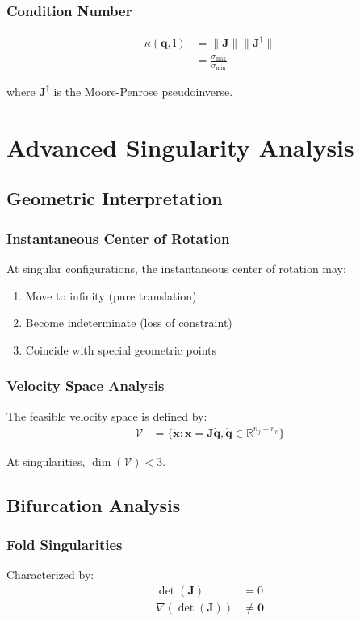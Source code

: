 \documentclass[11pt,a4paper]{article}
\begin{document}
\subsubsection{Condition Number}
\begin{align}
\kappa(\bm{q}, \bm{l}) &= \|\bm{J}\| \|\bm{J}^{\dagger}\| \\
&= \frac{\sigma_{\max}}{\sigma_{\min}}
\end{align}

where $\bm{J}^{\dagger}$ is the Moore-Penrose pseudoinverse.

\section{Advanced Singularity Analysis}

\subsection{Geometric Interpretation}

\subsubsection{Instantaneous Center of Rotation}
At singular configurations, the instantaneous center of rotation may:
\begin{enumerate}
    \item Move to infinity (pure translation)
    \item Become indeterminate (loss of constraint)
    \item Coincide with special geometric points
\end{enumerate}

\subsubsection{Velocity Space Analysis}
The feasible velocity space is defined by:
\begin{align}
\mathcal{V} &= \{\dot{\bm{x}} : \dot{\bm{x}} = \bm{J}\dot{\bm{q}}, \dot{\bm{q}} \in \mathbb{R}^{n_j+n_c}\}
\end{align}

At singularities, $\dim(\mathcal{V}) < 3$.

\subsection{Bifurcation Analysis}

\subsubsection{Fold Singularities}
Characterized by:
\begin{align}
\det(\bm{J}) &= 0 \\
\nabla(\det(\bm{J})) &\neq \bm{0}
\end{align}
\end{document}
